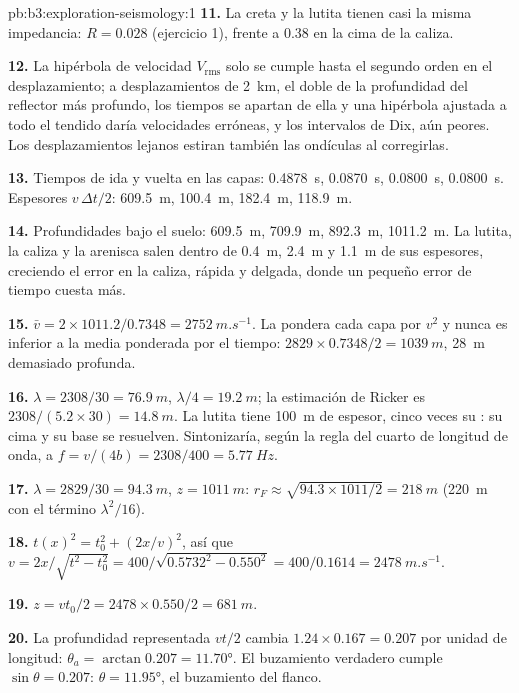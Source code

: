\begin{solution}{pb:b3:exploration-seismology:1}
\textbf{11.} La creta y la lutita tienen casi la misma impedancia: $R = 0.028$
(ejercicio 1), frente a 0.38 en la cima de la caliza.

\textbf{12.} La hipérbola de velocidad $V_{\text{rms}}$ solo se cumple hasta el
segundo orden en el desplazamiento; a desplazamientos de \qty{2}{km}, el doble
de la profundidad del reflector más profundo, los tiempos se apartan de ella y
una hipérbola ajustada a todo el tendido daría velocidades erróneas, y los
intervalos de Dix, aún peores. Los desplazamientos lejanos estiran también las ondículas al corregirlas.

\textbf{13.} Tiempos de ida y vuelta en las capas: \qty{0.4878}{s}, \qty{0.0870}{s},
\qty{0.0800}{s}, \qty{0.0800}{s}. Espesores $v\,\Delta t/2$: \qty{609.5}{m},
\qty{100.4}{m}, \qty{182.4}{m}, \qty{118.9}{m}.

\textbf{14.} Profundidades bajo el suelo: \qty{609.5}{m}, \qty{709.9}{m},
\qty{892.3}{m}, \qty{1011.2}{m}. La lutita, la caliza y la arenisca salen
dentro de \qty{0.4}{m}, \qty{2.4}{m} y \qty{1.1}{m} de sus espesores, creciendo
el error en la caliza, rápida y delgada, donde un pequeño error de tiempo
cuesta más.

\textbf{15.} $\bar v = 2\times1011.2/0.7348 = \qty{2752}{m.s^{-1}}$. La
 pondera cada capa por $v^2$ y nunca es inferior a la
media ponderada por el tiempo: $2829\times0.7348/2 = \qty{1039}{m}$, \qty{28}{m} demasiado profunda.

\textbf{16.} $\lambda = 2308/30 = \qty{76.9}{m}$, $\lambda/4 = \qty{19.2}{m}$;
la estimación de Ricker es $2308/(5.2\times30) = \qty{14.8}{m}$. La lutita tiene
\qty{100}{m} de espesor, cinco veces su : su cima y su base
se resuelven. Sintonizaría, según la regla del cuarto de longitud de onda, a $f = v/(4b) =
2308/400 = \qty{5.77}{Hz}$.

\textbf{17.} $\lambda = 2829/30 = \qty{94.3}{m}$, $z = \qty{1011}{m}$:
$r_F \approx \sqrt{94.3\times1011/2} = \qty{218}{m}$ (\qty{220}{m} con el
término $\lambda^2/16$).

\textbf{18.} $t(x)^2 = t_0^2 + (2x/v)^2$, así que $v = 2x/\sqrt{t^2 - t_0^2} =
400/\sqrt{0.5732^2 - 0.550^2} = 400/0.1614 = \qty{2478}{m.s^{-1}}$.

\textbf{19.} $z = vt_0/2 = 2478\times0.550/2 = \qty{681}{m}$.

\textbf{20.} La profundidad representada $vt/2$ cambia $1.24\times0.167 = 0.207$ por
unidad de longitud: $\theta_a = \arctan0.207 = \ang{11.70}$. El buzamiento verdadero
cumple $\sin\theta = 0.207$: $\theta = \ang{11.95}$, el buzamiento del flanco.


\end{solution}
